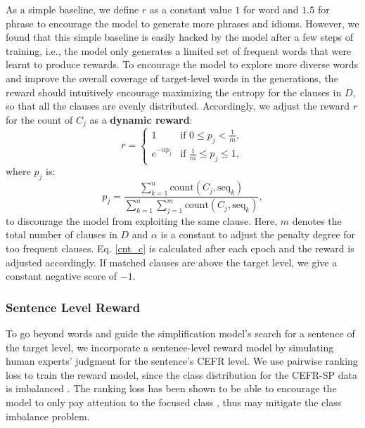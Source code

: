As a simple baseline, we define $r$ as a constant value $1$ for word and $1.5$ for phrase
to encourage the model to generate more phrases and idioms. 
However, we found that this simple baseline is easily hacked by the model after a few steps of training, i.e., the model only generates a limited set of frequent words that were learnt to produce rewards.
To encourage the model to explore more diverse words and improve the overall coverage of target-level words in the generations, the reward should intuitively encourage maximizing the entropy for the clauses in $D$, 
so that all the clauses are evenly distributed. Accordingly, we adjust the reward $r$ for the count of $C_j$ as a \textbf{dynamic reward}:
\begin{equation}\label{reward}
     r = \begin{cases} 1 & \text{if } 0 \le p_j < \frac{1}{m}, \\ e^{-\alpha p_j} & \text{if } \frac{1}{m} \le p_j \le 1, \end{cases} 
\end{equation}
where $p_j$ is:
\begin{equation}\label{cnt_c}
    p_j = \frac{\sum_{k=1}^{n} \text{count}(C_j, \text{seq}_k)}{\sum_{k=1}^{n} \sum_{j=1}^{m} \text{count}(C_j, \text{seq}_k)},
\end{equation}
to discourage the model from exploiting the same clause. 
Here, $m$ denotes the total number of clauses in $D$ and $\alpha$ is a constant to adjust the penalty degree for too frequent clauses. 
Eq. \ref{cnt_c} is calculated after each epoch and the reward is adjusted accordingly.
If matched clauses are above the target level, we give a constant negative score of $-1$.

    


\subsubsection{Sentence Level Reward}    
To go beyond words and guide the simplification model’s search for a sentence of the target level, we incorporate a sentence-level reward model by simulating human experts’ judgment for the sentence’s CEFR level. 
We use pairwise ranking loss to train the reward model,
since the class distribution for the CEFR-SP data is imbalanced \cite{arase-etal-2022-cefr}. %
The ranking loss has been shown to be able to encourage the model to only pay attention to the focused class \cite{henning-etal-2023-survey}, thus may mitigate the class imbalance problem. 

